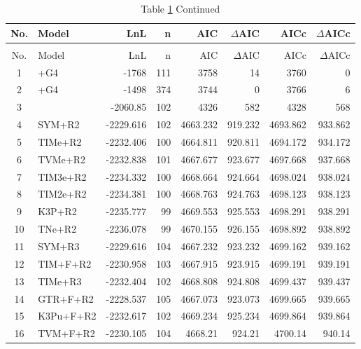 \singlespacing
\begin{longtable}{clrrrrrr}
  \caption{Model selection of 230 models of nucleotide and codon evolution.}\label{tab:AIC_full}\\\toprule
  No. & Model & LnL & n & AIC & $\Delta$AIC & AICc & $\Delta$AICc \\   \hline \endfirsthead
  \caption*{Table \ref{tab:AIC_full} Continued}\\\toprule
  No. & Model & LnL & n & AIC & $\Delta$AIC & AICc & $\Delta$AICc \\   \hline \endhead
  \hline \endfoot
  \bottomrule
  \endlastfoot

	1 & \selacDMS+G4 & -1768 & 111 & 3758 & 14 & 3760 & 0 \\ 
	2 & \selac+G4 & -1498 & 374 & 3744 & 0 & 3766 & 6 \\ 
	3 & \phydms & -2060.85 & 102 & 4326 & 582 & 4328 & 568 \\ 
	4 & SYM+R2 & -2229.616 & 102 & 4663.232 & 919.232 & 4693.862 & 933.862 \\ 
	5 & TIMe+R2 & -2232.406 & 100 & 4664.811 & 920.811 & 4694.172 & 934.172 \\ 
	6 & TVMe+R2 & -2232.838 & 101 & 4667.677 & 923.677 & 4697.668 & 937.668 \\ 
	7 & TIM3e+R2 & -2234.332 & 100 & 4668.664 & 924.664 & 4698.024 & 938.024 \\ 
	8 & TIM2e+R2 & -2234.381 & 100 & 4668.763 & 924.763 & 4698.123 & 938.123 \\ 
	9 & K3P+R2 & -2235.777 & 99 & 4669.553 & 925.553 & 4698.291 & 938.291 \\ 
	10 & TNe+R2 & -2236.078 & 99 & 4670.155 & 926.155 & 4698.892 & 938.892 \\ 
	11 & SYM+R3 & -2229.616 & 104 & 4667.232 & 923.232 & 4699.162 & 939.162 \\ 
	12 & TIM+F+R2 & -2230.958 & 103 & 4667.915 & 923.915 & 4699.191 & 939.191 \\ 
	13 & TIMe+R3 & -2232.404 & 102 & 4668.808 & 924.808 & 4699.437 & 939.437 \\ 
	14 & GTR+F+R2 & -2228.537 & 105 & 4667.073 & 923.073 & 4699.665 & 939.665 \\ 
	15 & K3Pu+F+R2 & -2232.617 & 102 & 4669.234 & 925.234 & 4699.864 & 939.864 \\ 
	16 & TVM+F+R2 & -2230.105 & 104 & 4668.21 & 924.21 & 4700.14 & 940.14 \\ 

\end{longtable}
